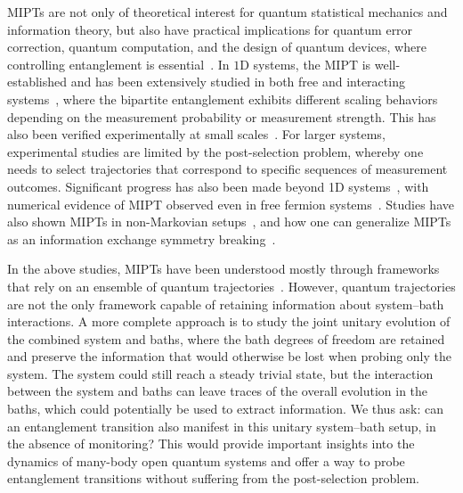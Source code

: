 \documentclass[reprint, superscriptaddress, aps, prl]{revtex4-2}
\begin{document}
MIPTs are not only of theoretical interest for quantum statistical mechanics and information theory, but also have practical implications for quantum error correction, quantum computation, and the design of quantum devices, where controlling entanglement is essential~\cite{ChoiAltman2020, FidkowskiHastings2021}.
In $1$D systems, the MIPT is well-established and has been extensively studied in both free and interacting systems~\cite{CaoDeLuca2019, BaoAltman2020, GullansHuse2020, FujiAshida2020, GullansHuse2020a, AlbertonDiehl2021, BaoAltman2021, TurkeshiSchiro2021, Sierant2022dissipativefloquet, CoppolaCollura2022, GalSchiro2023, GranetDreyer2023, FavaNahum2023, LoioTurkeshi2023, XingPoletti2024, PoboikoMirlin2025}, where the bipartite entanglement exhibits different scaling behaviors depending on the measurement probability or measurement strength.
This has also been verified experimentally at small scales~\cite{NoelHuse2022, Google2023, KohMinnich2023}.
For larger systems, experimental studies are limited by the post-selection problem, whereby one needs to select trajectories that correspond to specific sequences of measurement outcomes.
Significant progress has also been made beyond 1D systems~\cite{TurkeshiDalmonte2020, LuntPal2021, JianLudwig2022, LiuChen2022, SierantTurkeshi2022}, with numerical evidence of MIPT observed even in free fermion systems~\cite{TurkeshiDalmonte2020, LuntPal2021, JianLudwig2022, LiuChen2022, SierantTurkeshi2022, PoboikoMirlin2024}.
Studies have also shown MIPTs in non-Markovian setups~\cite{ChiriacoDalmonte2023, TsitsishviliChiriaco2024, MuzziChriaco2025}, and how one can generalize MIPTs as an information exchange symmetry breaking~\cite{KellyMarino2025, KellyMarino2025b}.

In the above studies, MIPTs have been understood mostly through frameworks that rely on an ensemble of quantum trajectories~\cite{GardinerZoller2004, WisemanMilburn2009, Jacobs2014, Breuer2022}.
However, quantum trajectories are not the only framework capable of retaining information about system–bath interactions.
A more complete approach is to study the joint unitary evolution of the combined system and baths, where the bath degrees of freedom are retained and preserve the information that would otherwise be lost when probing only the system.
The system could still reach a steady trivial state, but the interaction between the system and baths can leave traces of the overall evolution in the baths, which could potentially be used to extract information.
We thus ask: can an entanglement transition also manifest in this unitary system–bath setup, in the absence of monitoring?
This would provide important insights into the dynamics of many-body open quantum systems and offer a way to probe entanglement transitions without suffering from the post-selection problem.
\end{document}

